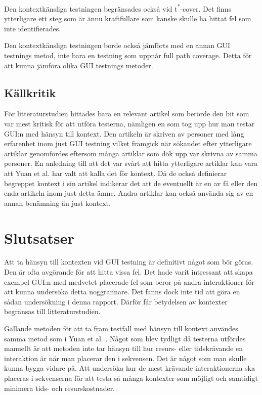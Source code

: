 Den kontextkänsliga testningen begränsades också vid t\textsuperscript{*}-cover. Det finns ytterligare ett steg som är ännu kraftfullare som kanske skulle ha hittat fel som inte identifierades.

Den kontextkänsliga testningen borde också jämförts med en annan GUI testnings metod, inte bara en testning som uppnår full path coverage. Detta för att kunna jämföra olika GUI testnings metoder.

\subsection{Källkritik}

För litteraturstudien hittades bara en relevant artikel som berörde den bit som var mest kritisk för att utföra testerna, nämligen en som tog upp hur man testar GUI:n med hänsyn till kontext. Den artikeln är skriven av personer med lång erfarenhet inom just GUI testning vilket framgick när sökandet efter ytterligare artiklar genomfördes eftersom många artiklar som dök upp var skrivna av samma personer. En anledning  till att det var svårt att hitta ytterligare artiklar kan vara att Yuan et al. \cite{yuan2011gui} har valt att kalla det för kontext. Då de också definierar begreppet kontext i sin artikel indikerar det att de eventuellt är en av få eller den enda artikeln inom just detta ämne. Andra artiklar kan också använda sig av en annan benämning än just kontext.

\section{Slutsatser}
\label{sec:conclusions-holmberg}

Att ta hänsyn till kontexten vid GUI testning är definitivt något som bör göras. Den är ofta avgörande för att hitta vissa fel. Det hade varit intressant att skapa exempel GUI:n med medvetet placerade fel som beror på andra interaktioner för att kunna undersöka detta noggrannare. Det fanns dock inte tid att göra en sådan undersökning i denna rapport. Därför får betydelsen av kontexter begränsas till litteraturstudien.

Gällande metoden för att ta fram testfall med hänsyn till kontext användes samma metod som i Yuan et al. \cite{yuan2011gui}. Något som blev tydligt då testerna utfördes manuellt är att metoden inte tar hänsyn till hur resurs- eller tidskrävande en interaktion är när man placerar den i sekvensen. Det är något som man skulle kunna bygga vidare på. Att undersöka hur de mest krävande interaktionerna ska placeras i sekvenserna för att testa så många kontexter som möjligt och samtidigt minimera tids- och resurskostnader.

